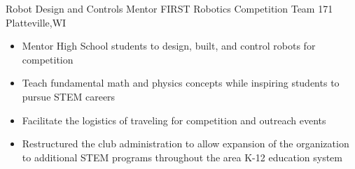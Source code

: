 \documentclass[11pt,letterpaper,roman]{moderncv} %
\begin{document}
{Robot Design and Controls Mentor}
{FIRST Robotics Competition Team 171}
{Platteville,WI}{}{
\begin{itemize}
    \item Mentor High School students to design, built, and control robots for competition
    \item Teach fundamental math and physics concepts while inspiring students to pursue STEM careers
    \item Facilitate the logistics of traveling for competition and outreach events
    \item Restructured the club administration to allow expansion of the organization to additional STEM programs throughout the area K-12 education system
\end{itemize}
}


\end{document}
